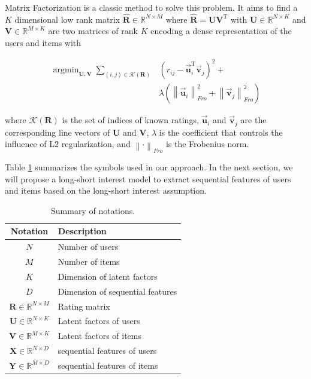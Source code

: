 \documentclass{sig-alternate-05-2015}
\DeclareMathOperator*{\argmin}{argmin}
\begin{document}
Matrix Factorization is a classic method to solve this problem.
It aims to find a $K$ dimensional low rank matrix $\mathbf{\hat{R}} \in \mathbb{R}^{N \times M}$
where $\mathbf{\hat{R}} = \mathbf{U} \mathbf{V}^\mathrm{T}$ with
$\mathbf{U} \in \mathbb{R}^{N \times K}$ and $\mathbf{V} \in \mathbb{R}^{M \times K}$
are two matrices of rank $K$ encoding a dense representation of the users and items with

\begin{equation}
\begin{aligned}
	\argmin_{\mathbf{U},\mathbf{V}}
	\sum_{(i,j) \in \mathcal{K}(\mathbf{R})}
	&( r_{ij} - \vec{\mathbf{u}}_i^{\mathrm{T}} \vec{\mathbf{v}}_j ) ^ 2 + \\
	&\lambda ( \left\| \vec{\mathbf{u}}_i \right\|_{Fro}^2 +
	\left\| \vec{\mathbf{v}}_j \right\|_{Fro}^2 )
\end{aligned}
\end{equation}

where $\mathcal{K}(\mathbf{R})$ is the set of indices of known ratings,
$\vec{\mathbf{u}}_i$ and $\vec{\mathbf{v}}_j$
are the corresponding line vectors of $\mathbf{U}$ and $\mathbf{V}$,
$\lambda$ is the coefficient that controls the influence of L2 regularization,
and $\left\| \cdot \right\|_{Fro}$ is the Frobenius norm.

Table \ref{tab:notations} summarizes the symbols used in our approach.
In the next section, we will propose a long-short interest model
to extract sequential features of users and items based on the long-short interest assumption.

\begin{table}[htbp]
    \centering
    \caption{Summary of notations.}
    \label{tab:notations}
    \begin{tabular}{|c|l|}
        \hline
        \textbf{Notation} & \textbf{Description} \\
        \hline
        $N$ & Number of users \\
        $M$ & Number of items \\
        $K$ & Dimension of latent factors \\
        $D$ & Dimension of sequential features \\
        $\mathbf{R} \in \mathbb{R}^{N \times M}$ & Rating matrix \\
        $\mathbf{U} \in \mathbb{R}^{N \times K}$ & Latent factors of users \\
        $\mathbf{V} \in \mathbb{R}^{M \times K}$ & Latent factors of items \\
        $\mathbf{X} \in \mathbb{R}^{N \times D}$ & sequential features of users \\
        $\mathbf{Y} \in \mathbb{R}^{M \times D}$ & sequential features of items \\
        \hline
    \end{tabular}
\end{table}
\end{document}
